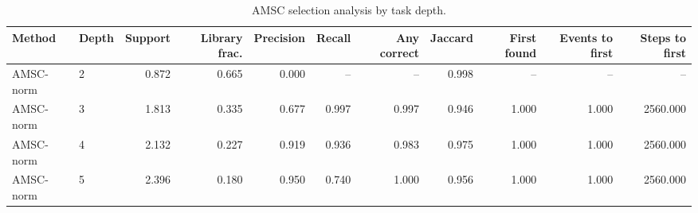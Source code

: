 \begin{table}[ht]
    \caption{AMSC selection analysis by task depth.}
    \label{tbl:amsc_selection_depth}
    \centering
    \scriptsize
    \begin{tabular}{llrrrrrrrrr}
    \toprule
Method & Depth & Support & Library frac. & Precision & Recall & Any correct & Jaccard & First found & Events to first & Steps to first \\
    \midrule
AMSC-norm & 2 & 0.872 & 0.665 & 0.000 & -- & -- & 0.998 & -- & -- & -- \\
AMSC-norm & 3 & 1.813 & 0.335 & 0.677 & 0.997 & 0.997 & 0.946 & 1.000 & 1.000 & 2560.000 \\
AMSC-norm & 4 & 2.132 & 0.227 & 0.919 & 0.936 & 0.983 & 0.975 & 1.000 & 1.000 & 2560.000 \\
AMSC-norm & 5 & 2.396 & 0.180 & 0.950 & 0.740 & 1.000 & 0.956 & 1.000 & 1.000 & 2560.000 \\
    \bottomrule
    \end{tabular}
\end{table}
